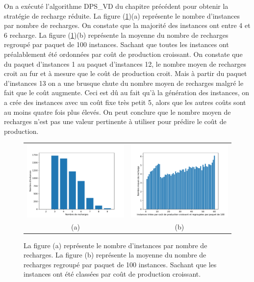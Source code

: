  On a exécuté l'algorithme DPS\_VD du chapitre précédent pour obtenir la stratégie de recharge réduite. La figure (\ref{6000_recharge})(a) représente le nombre d'instances par nombre de recharges. On constate que la majorité des instances ont entre 4 et 6 recharge. La figure (\ref{6000_recharge})(b) représente la moyenne du nombre de recharges regroupé par paquet de 100 instances. Sachant que toutes les instances ont préalablement été ordonnées par coût de production croissant. On constate que du paquet d'instances 1 au paquet d'instances 12, le nombre moyen de recharges croit au fur et à mesure que le coût de production croit. Mais à partir du paquet d'instances 13  on a une brusque chute du nombre moyen de recharges malgré le fait que le coût augmente. Ceci est dû au fait qu'à la génération des instances, on a crée des instances avec un coût fixe très petit 5, alors que les autres coûts sont au moins quatre fois plus élevés. On peut conclure que le nombre moyen de recharges n'est pas une valeur pertinente à utiliser pour prédire le coût de production.

\begin{figure}[H]
	\centering
	\begin{tabular}{c c}
		\includegraphics[width=9cm]{images_these/Nombre_dinstance_par_nb_recharge.pdf} &
		\includegraphics[width=9cm]{images_these/Stats_instances_Nbrecharge.pdf}
		\\
		(a) & (b)
	\end{tabular}
	\caption[Moyenne du nombre de recharges regroupé par paquet de 100 instances]{La figure (a) représente le nombre d'instances par nombre de recharges. La figure (b) représente la moyenne du nombre de recharges regroupé par paquet de 100 instances. Sachant que les instances ont été classées par coût de production croissant. }\label{6000_recharge}
\end{figure}

